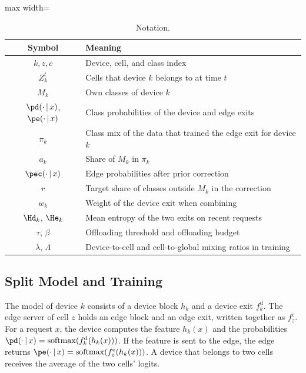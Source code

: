 \begin{table}[t]
\centering
\caption{Notation.}
\label{tab:notation}
\begin{adjustbox}{max width=\columnwidth}
\begin{tabular}{cl}
\toprule
Symbol & Meaning \\
\midrule
$k, z, c$ & Device, cell, and class index \\
$Z_k^t$ & Cells that device $k$ belongs to at time $t$ \\
$M_k$ & Own classes of device $k$ \\
$\pd(\cdot\,|\,x)$, $\pe(\cdot\,|\,x)$ & Class probabilities of the device and edge exits \\
$\pi_k$ & Class mix of the data that trained the edge exit for device $k$ \\
$a_k$ & Share of $M_k$ in $\pi_k$ \\
$\pec(\cdot\,|\,x)$ & Edge probabilities after prior correction \\
$r$ & Target share of classes outside $M_k$ in the correction \\
$w_k$ & Weight of the device exit when combining \\
$\Hd_k$, $\He_k$ & Mean entropy of the two exits on recent requests \\
$\tau$, $\beta$ & Offloading threshold and offloading budget \\
$\lambda$, $\Lambda$ & Device-to-cell and cell-to-global mixing ratios in training \\
\bottomrule
\end{tabular}
\end{adjustbox}
\end{table}

\subsection{Split Model and Training}
\label{sec:training}

The model of device $k$ consists of a device block $h_k$ and a device exit $f_k^{\mathrm{d}}$. The edge server of cell $z$ holds an edge block and an edge exit, written together as $f_z^{\mathrm{e}}$. For a request $x$, the device computes the feature $h_k(x)$ and the probabilities $\pd(\cdot\,|\,x)=\mathrm{softmax}(f_k^{\mathrm{d}}(h_k(x)))$. If the feature is sent to the edge, the edge returns $\pe(\cdot\,|\,x)=\mathrm{softmax}(f_z^{\mathrm{e}}(h_k(x)))$. A device that belongs to two cells receives the average of the two cells' logits.

